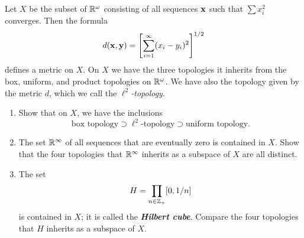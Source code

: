 %
\begin{exercise}[ID=2.20.8]
  Let $X$ be the subset of $\mathbb{R}^\omega$ consisting of all sequences $\mathbf{x}$ such that $\sum x_i^2$ converges.
  Then the formula
  \begin{equation*}
    d(\mathbf{x}, \mathbf{y}) = \left[ \sum_{i=1}^\infty (x_i - y_i)^2 \right]^{1/2}
  \end{equation*}
  defines a metric on $X$.
  On $X$ we have the three topologies it inherits from the box, uniform, and product topologies on $\mathbb{R}^\omega$.
  We have also the topology given by the metric $d$, which we call the $\ell^2$\textit{-topology}.
  \begin{enumerate}[label={(\alph*)}, align=left, leftmargin=\parindent, listparindent=\parindent, labelwidth=0pt, itemindent=!]
    \item
      Show that on $X$, we have the inclusions
      \begin{equation*}
        \text{box topology} \supset \ell^2\text{-topology} \supset \text{uniform topology}.
      \end{equation*}
    \item
      The set $\mathbb{R}^\infty$ of all sequences that are eventually zero is contained in $X$.
      Show that the four topologies that $\mathbb{R}^\infty$ inherits as a subspace of $X$ are all distinct.
    \item
      The set
      \begin{equation*}
        H = \prod_{n\in\mathbb{Z}_+} [0, 1/n]
      \end{equation*}
      is contained in $X$; it is called the \textit{\textbf{Hilbert cube}}.
      Compare the four topologies that $H$ inherits as a subspace of $X$.
  \end{enumerate}
\end{exercise}
%
